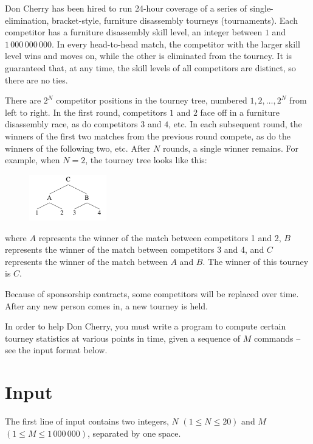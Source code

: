 Don Cherry has been hired to run 24-hour coverage of a series of single-elimination, bracket-style,
furniture disassembly tourneys (tournaments). Each competitor has a furniture disassembly skill
level, an integer between $1$ and $1\,000\,000\,000$. In every head-to-head match, the competitor with
the larger skill level wins and moves on, while the other is eliminated from the tourney. It is
guaranteed that, at any time, the skill levels of all competitors are distinct, so there are no ties.

There are $2^N$ competitor positions in the tourney tree, numbered $1, 2, \dots, 2^N$ from left to
right. In the first round, competitors $1$ and $2$ face off in a furniture disassembly race, as do
competitors $3$ and $4$, etc. In each subsequent round, the winners of the first two matches from the
previous round compete, as do the winners of the following two, etc. After $N$ rounds, a single
winner remains. For example, when $N = 2$, the tourney tree looks like this:

\begin{figure}[h]
    \begin{center}
    \includegraphics[width=0.3\textwidth]{tree}
    \end{center}
\end{figure}
where $A$ represents the winner of the match between competitors 1 and 2, $B$ represents the winner of
the match between competitors 3 and 4, and $C$ represents the winner of the match between $A$ and
$B$. The winner of this tourney is $C$.

Because of sponsorship contracts, some competitors will be replaced over time. After any new person
comes in, a new tourney is held.

In order to help Don Cherry, you must write a program to compute certain tourney statistics at
various points in time, given a sequence of $M$ commands -- see the input format below.

\section*{Input}
The first line of input contains two integers, $N$ $(1 \le N \le 20)$ and $M$ $(1 \le M \le
1\,000\,000)$, separated by one space.

